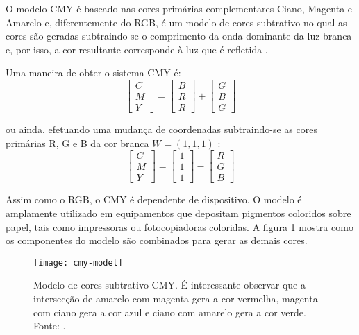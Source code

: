 O modelo CMY é baseado nas cores primárias complementares Ciano, Magenta e Amarelo e, diferentemente do RGB, é um modelo de cores subtrativo no qual as cores são geradas subtraindo-se o comprimento da onda dominante da luz branca e, por isso, a cor resultante corresponde à luz que é refletida \citep{gonzalez:02}.

Uma maneira de obter o sistema CMY é:\\
\begin{equation}
  \begin{bmatrix}
    C \\ M \\ Y
  \end{bmatrix} = 
  \begin{bmatrix}
    B \\ R \\ R
  \end{bmatrix} +
  \begin{bmatrix}
    G \\ B \\ G
  \end{bmatrix}
\end{equation}

ou ainda, efetuando uma mudança de coordenadas subtraindo-se as cores primárias R, G e B da cor branca $W = (1, 1, 1)$ \citep{gonzalez:02}:
\begin{equation}
  \begin{bmatrix}
    C \\ M \\ Y
  \end{bmatrix} = 
  \begin{bmatrix}
    1 \\ 1 \\ 1
  \end{bmatrix} -
  \begin{bmatrix}
    R \\ G \\ B
  \end{bmatrix}
\end{equation}

Assim como o RGB, o CMY é dependente de dispositivo. O modelo é amplamente utilizado em equipamentos que depositam pigmentos coloridos sobre papel, tais como impressoras ou fotocopiadoras coloridas. A figura \ref{fig:cmy-model} mostra como os componentes do modelo são combinados para gerar as demais cores.

\begin{figure}[!h]
  \centering
  \texttt{[image: cmy-model]}
  \caption[Modelo de cores subtrativo CMY]{Modelo de cores subtrativo CMY. É interessante observar que a intersecção de amarelo com magenta gera a cor vermelha, magenta com ciano gera a cor azul e ciano com amarelo gera a cor verde. Fonte: \citet{rus:08}.}
  \label{fig:cmy-model}
\end{figure}

